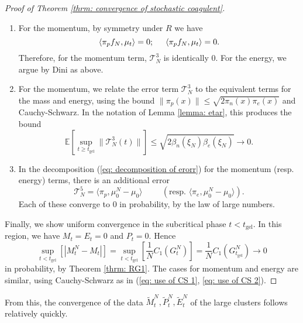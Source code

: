 \begin{proof}[Proof of Theorem \ref{thrm: convergence of stochastic coagulent}]
\begin{enumerate}[label=\roman{*}).]
       \item For the momentum, by symmetry under $R$ we have \begin{equation}
           \langle \pi_p f_N, \mu_t\rangle =0; \hspace{0.5cm} \langle \pi_p f_N, \mu_t\rangle =0.
       \end{equation} Therefore, for the momentum term, $\mathcal{T}^3_N$ is identically $0$. For the energy, we argue by Dini as above.
       \item For the momentum, we relate the error term $\mathcal{T}^3_N$ to the equivalent terms for the mass and energy, using the bound $\|\pi_p(x)\|\le\sqrt{2\pi_n(x)\pi_e(x)}$ and Cauchy-Schwarz. In the notation of Lemma \ref{lemma: etar}, this produces the bound \begin{equation}
           \mathbb{E}\left[\sup_{t\geq t_\text{gel}} \|\mathcal{T}^3_N(t)\|\right] \leq \sqrt{2 \beta_n(\xi_N)\beta_e(\xi_N)} \rightarrow 0.
       \end{equation}
       \item In the decomposition (\ref{eq: decomposition of erorr}) for the momentum (resp. energy) terms, there is an additional error \begin{equation}
           \mathcal{T}^5_N = \langle \pi_p, \mu^N_0-\mu_0\rangle \hspace{1cm}\left(\text{resp. } \langle \pi_e, \mu^N_0-\mu_0\rangle\right).
       \end{equation} Each of these converge to $0$ in probability, by the law of large numbers.
   \end{enumerate} \bigskip  Finally, we show uniform convergence in the subcritical phase $t<t_\text{gel}$. In this region, we have $M_t=E_t=0$ and $P_t=0$. Hence \begin{equation}
       \sup_{t<t_\text{gel}} \left[|M^N_t-M_t|\right] = \sup_{t<t_\text{gel}}\left[ \frac{1}{N}C_1(G^N_t)\right]=\frac{1}{N}C_1(G^N_{t_\text{gel}}) \rightarrow 0
   \end{equation} in probability, by Theorem \ref{thrm: RG1}. The cases for momentum and energy are similar, using Cauchy-Schwarz as in (\ref{eq: use of CS 1}, \ref{eq: use of CS 2}). \end{proof} 
   
   From this, the convergence of the data $\widetilde{M}^N_t, \widetilde{P}^N_t, \widetilde{E}^N_t$ of the large clusters follows relatively quickly.
   
